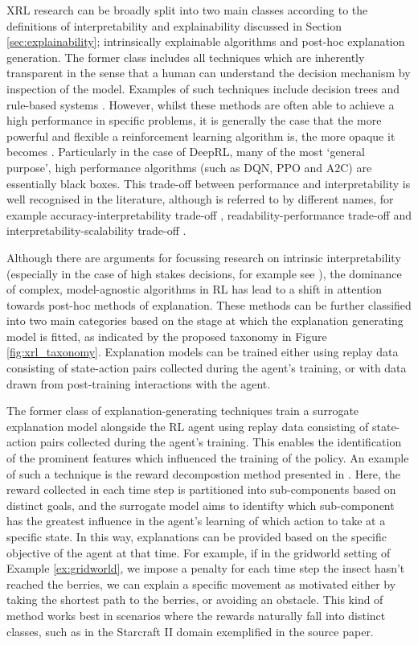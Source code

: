 \documentclass{article}
\begin{document}
XRL research can be broadly split into two main classes according to the definitions of interpretability and explainability discussed in Section \ref{sec:explainability}; intrinsically explainable algorithms and post-hoc explanation generation. The former class includes all techniques which are inherently transparent in the sense that a human can understand the decision mechanism by inspection of the model. Examples of such techniques include decision trees \cite{pmlr} and rule-based systems \cite{sewak2022deep}. However, whilst these methods are often able to achieve a high performance in specific problems, it is generally the case that the more powerful and flexible a reinforcement learning algorithm is, the more opaque it becomes \cite{sewak2022deep}. Particularly in the case of DeepRL, many of the most `general purpose', high performance algorithms (such as DQN, PPO and A2C) are essentially black boxes. This trade-off between performance and interpretability is well recognised in the literature, although is referred to by different names, for example accuracy-interpretability trade-off \cite{rudin2019stop}, readability-performance trade-off \cite{dovsilovic2018explainable} and interpretability-scalability trade-off \cite{glanois2021survey}. 


Although there are arguments for focussing research on intrinsic interpretability (especially in the case of high stakes decisions, for example see \cite{rudin2019stop}), the dominance of complex, model-agnostic algorithms in RL has lead to a shift in attention towards post-hoc methods of explanation. These methods can be further classified into two main categories based on the stage at which the explanation generating model is fitted, as indicated by the proposed taxonomy in Figure \ref{fig:xrl_taxonomy}. Explanation models can be trained either using replay data consisting of state-action pairs collected during the agent's training, or with data drawn from post-training interactions with the agent. 

The former class of explanation-generating techniques train a surrogate explanation model alongside the RL agent using replay data consisting of state-action pairs collected during the agent's training. This enables the identification of the prominent features which influenced the training of the policy. An example of such a technique is the reward decompostion method presented in \cite{juozapaitis2019explainable}. Here, the reward collected in each time step is partitioned into sub-components based on distinct goals, and the surrogate model aims to identifty which sub-component has the greatest influence in the agent's learning of which action to take at a specific state. In this way, explanations can be provided based on the specific objective of the agent at that time. For example, if in the gridworld setting of Example \ref{ex:gridworld}, we impose a penalty for each time step the insect hasn't reached the berries, we can explain a specific movement as motivated either by taking the shortest path to the berries, or avoiding an obstacle. This kind of method works best in scenarios where the rewards naturally fall into distinct classes, such as in the Starcraft II domain exemplified in the source paper. 
\end{document}
